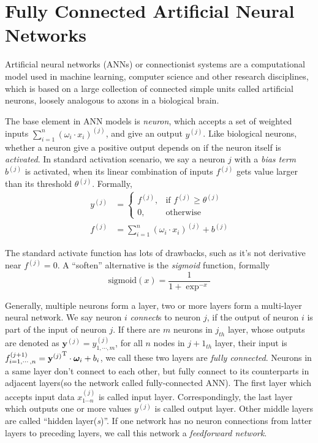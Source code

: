 \section{Fully Connected Artificial Neural Networks}
Artificial neural networks (ANNs) or connectionist systems are a computational model used in machine learning, 
computer science and other research disciplines, which is based on a large collection of connected simple units called artificial neurons, 
loosely analogous to axons in a biological brain\cite{kohonen1988introduction}.

The base element in ANN models is \textit{neuron}, which accepts a set of weighted inputs
$\sum_{i=1}^{n}(\omega_i\cdot x_i)^{(j)}$, and give an output $y^{(j)}$. 
Like biological neurons, whether a neuron give a positive output depends on if the
neuron itself is \textit{activated}. In standard activation scenario, 
we say a neuron $j$ with a \textit{bias term} $b^{(j)}$ is activated,
when its linear combination of inputs $f^{(j)}$ gets value larger than its threshold $\theta^{(j)}$.
Formally,
\begin{equation}
\begin{array}{rl}
y^{(j)}&=\left\{
        \begin{array}{rl}
        f^{(j)} ,& \textrm{if $f^{(j)} \ge \theta^{(j)}$} \\
        0 ,& \textrm{otherwise}
        \end{array}
\right. \\
f^{(j)}&=\sum_{i=1}^{n}(\omega_i\cdot x_i)^{(j)} + b^{(j)}
\end{array}
\end{equation}

The standard activate function has lots of drawbacks, such as it's not derivative
near $f^{(j)} = 0$. A ``soften'' alternative is the \textit{sigmoid} function,
formally
\begin{equation}
\textrm{sigmoid}(x)=\frac{1}{1+\exp^{-x}}
\end{equation} 

Generally, multiple neurons form a layer, two or more layers form a multi-layer
neural network. 
We say neuron $i$ \textit{connect}s to neuron $j$, if the output of neuron $i$ is
part of the input of neuron $j$.
If there are $m$ neurons in $j_{th}$ layer, whose outputs are denoted as $\mathbf{y}^{(j)} = y^{(j)}_{1,\cdots,m}$,
for all $n$ nodes in $j + 1_{th}$ layer, their input is $f^{(j+1)}_{i=1,\cdots,n}={\mathbf{y}^{(j)}}^{\rm T} \cdot \boldsymbol{\omega}_i + b_i$,
we call these two layers are \textit{fully connected}.
Neurons in a same layer don't connect to each other, but fully connect to its counterparts
in adjacent layers(so the network called fully-connected ANN). 
The first layer which accepts input data $x_{1\cdots n}^{(j)}$ is called input layer.
Correspondingly, the last layer which outputs one or more values $y^{(j)}$ is called output layer.
Other middle layers are called ``hidden layer(\textit{s})''.
If one network has no neuron connections from latter layers to preceding layers,
we call this network a \textit{feedforward network}.

